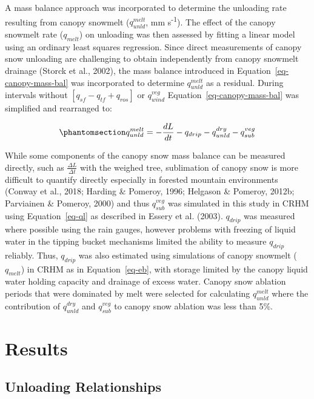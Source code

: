 \documentclass[
]{agujournal2019}
\begin{document}
A mass balance approach was incorporated to determine the unloading rate
resulting from canopy snowmelt (\(q_{unld}^{melt}\), mm
s\textsuperscript{-1}). The effect of the canopy snowmelt rate
(\(q_{melt}\)) on unloading was then assessed by fitting a linear model
using an ordinary least squares regression. Since direct measurements of
canopy snow unloading are challenging to obtain independently from
canopy snowmelt drainage (Storck et al., 2002), the mass balance
introduced in Equation~\ref{eq-canopy-mass-bal} was incorporated to
determine \(q_{unld}^{melt}\) as a residual. During intervals without
\([q_{sf} - q_{tf} + q_{ros}]\) or \(q_{wind}^{veg}\)
Equation~\ref{eq-canopy-mass-bal} was simplified and rearranged to:

\begin{equation}\phantomsection\label{eq-unld-melt-mass-bal}{
q_{unld}^{melt} = -\frac{dL}{dt} - q_{drip} - q_{unld}^{dry} - q_{sub}^{veg}
}\end{equation}

While some components of the canopy snow mass balance can be measured
directly, such as \(\frac{\Delta L}{\Delta t}\) with the weighed tree,
sublimation of canopy snow is more difficult to quantify directly
especially in forested mountain environments (Conway et al., 2018;
Harding \& Pomeroy, 1996; Helgason \& Pomeroy, 2012b; Parviainen \&
Pomeroy, 2000) and thus \(q_{sub}^{veg}\) was simulated in this study in
CRHM using Equation~\ref{eq-ql} as described in Essery et al. (2003).
\(q_{drip}\) was measured where possible using the rain gauges, however
problems with freezing of liquid water in the tipping bucket mechanisms
limited the ability to measure \(q_{drip}\) reliably. Thus, \(q_{drip}\)
was also estimated using simulations of canopy snowmelt (\(q_{melt}\))
in CRHM as in Equation~\ref{eq-eb}, with storage limited by the canopy
liquid water holding capacity and drainage of excess water. Canopy snow
ablation periods that were dominated by melt were selected for
calculating \(q_{unld}^{melt}\) where the contribution of
\(q_{unld}^{dry}\) and \(q_{sub}^{veg}\) to canopy snow ablation was
less than 5\%.

\section{Results}\label{results}

\subsection{Unloading Relationships}\label{sec-unld-rel}
\end{document}
